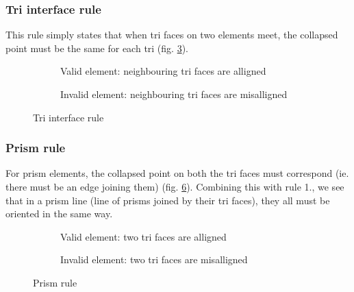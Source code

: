 {\subsubsection{Tri interface rule}
This rule simply states that when tri faces on two elements meet, the collapsed point must be the same for each tri (fig. \ref{fig:tri_interface_rule}).

\begin{figure}[h!]
    \centering
    \begin{subfigure}[b]{0.45\textwidth}
        \centering
        
        \caption{Valid element: neighbouring tri faces are alligned}
        \label{fig:prism_rule_ok_join}
    \end{subfigure}
    \hfill
    \begin{subfigure}[b]{0.45\textwidth}
        \centering
        
        \caption{Invalid element: neighbouring tri faces are misalligned}
        \label{fig:prism_rule_bad_join}
    \end{subfigure}
    \caption{Tri interface rule}
    \label{fig:tri_interface_rule}
\end{figure}

\subsubsection{Prism rule}
For prism elements, the collapsed point on both the tri faces must correspond (ie. there must be an edge joining them) (fig. \ref{fig:prism_rule}). Combining this with rule 1., we see that in a prism line (line of prisms joined by their tri faces), they all must be oriented in the same way.

\begin{figure}[h!]
    \centering
    \begin{subfigure}[b]{0.45\textwidth}
        \centering
        
        \caption{Valid element: two tri faces are alligned}
        \label{fig:prism_rule_ok}
    \end{subfigure}
    \hfill
    \begin{subfigure}[b]{0.45\textwidth}
        \centering
        
        \caption{Invalid element: two tri faces are misalligned}
        \label{fig:prism_rule_bad}
    \end{subfigure}
    \caption{Prism rule}
    \label{fig:prism_rule}
\end{figure}


}
